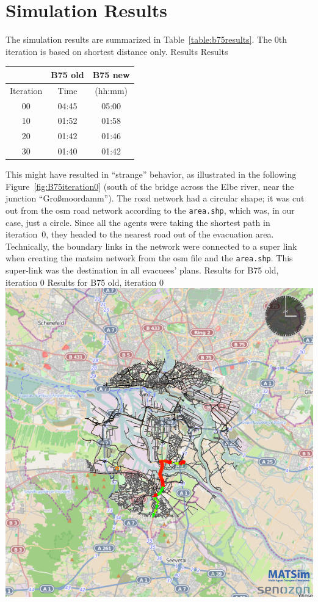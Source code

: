 \section{Simulation Results}
The simulation results are summarized in Table~\ref{table:b75results}. The 0th iteration is based on shortest distance only. 
%
\createtable%
{Results}%
{Results}%
{\label{table:b75results}}%
{%
\begin{tabular}{|c|c|c|}
	\hline \rule[-2ex]{0pt}{5.5ex}  & B75 old & B75 new \\ 
	\hline \rule[-2ex]{0pt}{5.5ex}  Iteration & Time &  (hh:mm) \\ 
	\hline \rule[-2ex]{0pt}{5.5ex}  00 & 04:45 &  05:00\\ 
	\hline \rule[-2ex]{0pt}{5.5ex}  10 & 01:52 &  01:58\\ 
	\hline \rule[-2ex]{0pt}{5.5ex}  20 & 01:42 &  01:46\\ 
	\hline \rule[-2ex]{0pt}{5.5ex}  30 & 01:40 &  01:42\\ 
	\hline 
\end{tabular}
}%
{}%
%
This might have resulted in ``strange'' behavior, as illustrated in the following Figure~\ref{fig:B75iteration0} (south of the bridge across the Elbe river, near the junction ``Gro{\ss}moordamm''). The road network had a circular shape; it was cut out from the osm road network according to the \lstinline|area.shp|, which was, in our case, just a circle. Since all the agents were taking the shortest path in iteration~0, they headed to the nearest road out of the evacuation area. Technically, the boundary links in the network were connected to a super link when creating the \gls{matsim} network from the \gls{osm} file and the \lstinline|area.shp|. This super-link was the destination in all evacuees' plans. 
%
\createfigure%
{Results for B75 old, iteration 0}%
{Results for B75 old, iteration 0}%
{\label{fig:B75iteration0}}%
{\includegraphics[width=0.7\linewidth]{scenarios/figures/B75iteration0}}%
